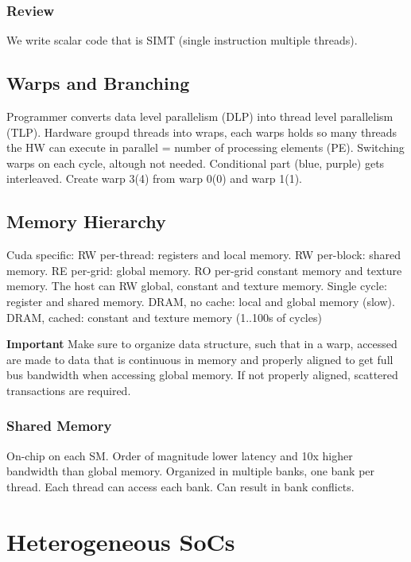\documentclass[a4paper, fontsize=8pt, landscape, DIV=1]{scrartcl}
\begin{document}
\begin{multicols*}{4}
  \subsubsection{Review}
  We write scalar code that is SIMT (single instruction multiple threads).

  \subsection{Warps and Branching}
  Programmer converts data level parallelism (DLP) into thread level parallelism (TLP).
  Hardware groupd threads into wraps, each warps holds so many threads the HW can execute
  in parallel = number of processing elements (PE).
  Switching warps on each cycle, altough not needed. Conditional part (blue, purple)
  gets interleaved. Create warp 3(4) from warp 0(0) and warp 1(1).

  \subsection{Memory Hierarchy}
  Cuda specific: RW per-thread: registers and local memory. RW per-block: shared memory.
  RE per-grid: global memory. RO per-grid constant memory and texture memory. The host
  can RW global, constant and texture memory.
  Single cycle: register and shared memory. DRAM, no cache: local and global memory (slow).
  DRAM, cached: constant and texture memory (1..100s of cycles)

  \textbf{Important} Make sure to organize data structure, such that in a warp, accessed are made
  to data that is continuous in memory and properly aligned to get full bus bandwidth when
  accessing global memory. If not properly aligned, scattered transactions are required.

  \subsubsection{Shared Memory}
  On-chip on each SM. Order of magnitude lower latency and 10x higher bandwidth than global
  memory. Organized in multiple banks, one bank per thread. Each thread can access each bank.
  Can result in bank conflicts.


  \section{Heterogeneous SoCs}



\end{multicols*}
\end{document}
